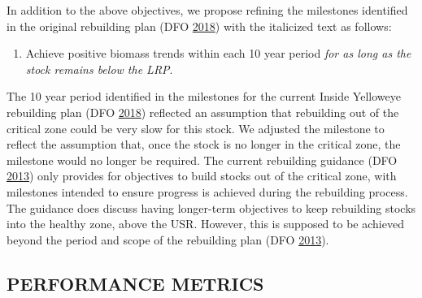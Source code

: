 \documentclass[11pt]{book}
\begin{document}
In addition to the above objectives, we propose refining the milestones identified in the original rebuilding plan (DFO \protect\hyperlink{ref-ifmp2018}{2018}) with the italicized text as follows:
\begin{enumerate}
\def\labelenumi{\arabic{enumi}.}
\setcounter{enumi}{5}

\item
  Achieve positive biomass trends within each 10 year period \emph{for as long as the stock remains below the LRP}.
\end{enumerate}
The 10 year period identified in the milestones for the current Inside Yelloweye rebuilding plan (DFO \protect\hyperlink{ref-ifmp2018}{2018}) reflected an assumption that rebuilding out of the critical zone could be very slow for this stock. We adjusted the milestone to reflect the assumption that, once the stock is no longer in the critical zone, the milestone would no longer be required. The current rebuilding guidance (DFO \protect\hyperlink{ref-dfo2013}{2013}) only provides for objectives to build stocks out of the critical zone, with milestones intended to ensure progress is achieved during the rebuilding process. The guidance does discuss having longer-term objectives to keep rebuilding stocks into the healthy zone, above the USR. However, this is supposed to be achieved beyond the period and scope of the rebuilding plan (DFO \protect\hyperlink{ref-dfo2013}{2013}).

\hypertarget{sec:objectives-metrics-pm}{%
\subsection{PERFORMANCE METRICS}\label{sec:objectives-metrics-pm}}
\end{document}
